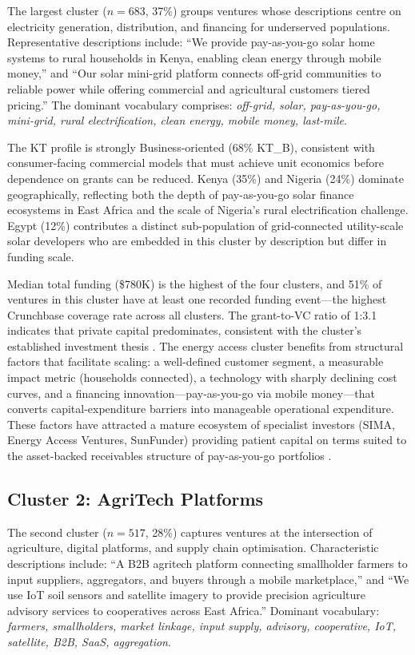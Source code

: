 \documentclass[review,12pt]{elsarticle}
\begin{document}
The largest cluster ($n = 683$, 37\%) groups ventures whose
descriptions centre on electricity generation, distribution, and
financing for underserved populations. Representative descriptions
include: ``We provide pay-as-you-go solar home systems to rural
households in Kenya, enabling clean energy through mobile money,''
and ``Our solar mini-grid platform connects off-grid communities to
reliable power while offering commercial and agricultural customers
tiered pricing.'' The dominant vocabulary comprises: \textit{off-grid,
solar, pay-as-you-go, mini-grid, rural electrification, clean energy,
mobile money, last-mile}.

The KT profile is strongly Business-oriented (68\% KT\_B), consistent
with consumer-facing commercial models that must achieve unit economics
before dependence on grants can be reduced. Kenya (35\%) and Nigeria
(24\%) dominate geographically, reflecting both the depth of
pay-as-you-go solar finance ecosystems in East Africa and the scale
of Nigeria's rural electrification challenge. Egypt (12\%) contributes
a distinct sub-population of grid-connected utility-scale solar
developers who are embedded in this cluster by description but differ
in funding scale.

Median total funding (\$780K) is the highest of the four clusters,
and 51\% of ventures in this cluster have at least one recorded
funding event---the highest Crunchbase coverage rate across all
clusters. The grant-to-VC ratio of 1:3.1 indicates that private
capital predominates, consistent with the cluster's established
investment thesis \citep{irena2022africa}. The energy access cluster
benefits from structural factors that facilitate scaling: a
well-defined customer segment, a measurable impact metric (households
connected), a technology with sharply declining cost curves, and a
financing innovation---pay-as-you-go via mobile money---that converts
capital-expenditure barriers into manageable operational expenditure.
These factors have attracted a mature ecosystem of specialist investors
(SIMA, Energy Access Ventures, SunFunder) providing patient capital
on terms suited to the asset-backed receivables structure of
pay-as-you-go portfolios \citep{huenteler2016solar}.

\subsection{Cluster 2: AgriTech Platforms}
\label{ssec:c2}

The second cluster ($n = 517$, 28\%) captures ventures at the
intersection of agriculture, digital platforms, and supply chain
optimisation. Characteristic descriptions include: ``A B2B agritech
platform connecting smallholder farmers to input suppliers,
aggregators, and buyers through a mobile marketplace,'' and ``We use
IoT soil sensors and satellite imagery to provide precision
agriculture advisory services to cooperatives across East Africa.''
Dominant vocabulary: \textit{farmers, smallholders, market linkage,
input supply, advisory, cooperative, IoT, satellite, B2B, SaaS,
aggregation}.
\end{document}
